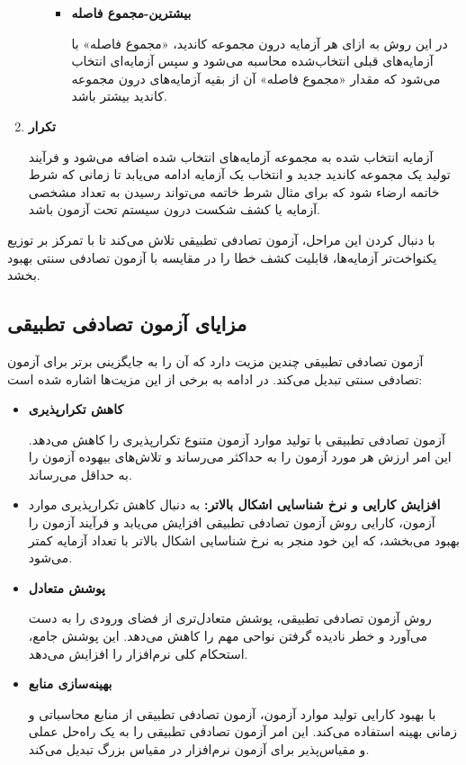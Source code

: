 \begin{enumerate}
\begin{itemize}
\begin{itemize}
			\item \textbf{بیشترین-مجموع فاصله}
			 
			در این روش \cite{zhou2021cost} به ازای هر آزمایه درون مجموعه کاندید، «مجموع فاصله» با آزمایه‌های قبلی انتخاب‌شده محاسبه می‌شود و سپس آزمایه‌ای انتخاب می‌شود که مقدار «مجموع فاصله» آن از بقیه آزمایه‌های درون مجموعه کاندید بیشتر باشد.
		\end{itemize}
		
	\end{itemize}
	
	\item \textbf{تکرار}
	
	 آزمایه انتخاب شده به مجموعه آزمایه‌های انتخاب شده اضافه می‌شود و فرآیند تولید یک مجموعه کاندید جدید و انتخاب یک آزمایه ادامه می‌یابد تا زمانی که شرط خاتمه ارضاء شود که برای مثال شرط خاتمه می‌تواند رسیدن به تعداد مشخصی آزمایه یا کشف شکست درون سیستم تحت آزمون باشد.
	 
\end{enumerate}
با دنبال کردن این مراحل، آزمون تصادفی تطبیقی تلاش می‌کند تا با تمرکز بر توزیع یکنواخت‌تر آزمایه‌ها، قابلیت کشف خطا را در مقایسه با آزمون تصادفی سنتی بهبود بخشد.

\subsection{مزایای آزمون تصادفی تطبیقی}
آزمون تصادفی تطبیقی چندین مزیت دارد که آن را به جایگزینی برتر برای آزمون تصادفی سنتی تبدیل می‌کند\cite{johansson2023comparison}. در ادامه به برخی از این مزیت‌ها اشاره شده است:
\begin{itemize}
	\item \textbf{کاهش تکرارپذیری}
	
	 آزمون تصادفی تطبیقی با تولید موارد آزمون متنوع تکرارپذیری را کاهش می‌دهد. این امر ارزش هر مورد آزمون را به حداکثر می‌رساند و تلاش‌های بیهوده آزمون را به حداقل می‌رساند.
	\item \textbf{افزایش کارایی و نرخ شناسایی اشکال بالاتر:}‌ به دنبال کاهش تکرارپذیری موارد آزمون، کارایی روش آزمون تصادفی تطبیقی افزایش می‌یابد و فرآیند آزمون را بهبود می‌بخشد، که این خود منجر به نرخ شناسایی اشکال بالاتر با تعداد آزمایه کمتر می‌شود.
	\item \textbf{پوشش متعادل}
	
	 روش آزمون تصادفی تطبیقی، پوشش متعادل‌تری از فضای ورودی را به دست می‌آورد و خطر نادیده گرفتن نواحی مهم را کاهش می‌دهد. این پوشش جامع، استحکام کلی نرم‌افزار را افزایش می‌دهد.
	\item \textbf{بهینه‌سازی منابع}
	
	 با بهبود کارایی تولید موارد آزمون، آزمون تصادفی تطبیقی از منابع محاسباتی و زمانی بهینه استفاده می‌کند. این امر آزمون تصادفی تطبیقی را به یک راه‌حل عملی و مقیاس‌پذیر برای آزمون نرم‌افزار در مقیاس بزرگ تبدیل می‌کند.
\end{itemize}

